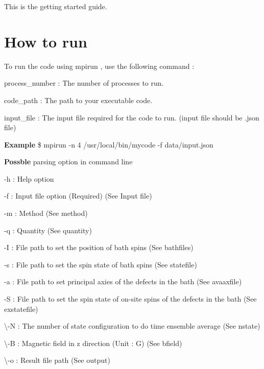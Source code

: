This is the getting started guide.\hypertarget{GettingStarted_HowToRun}{}\section{How to run}\label{GettingStarted_HowToRun}
To run the code using {\ttfamily  mpirun }, use the following command \-:





\begin{DoxyItemize}
\item process\-\_\-number \-: The number of processes to run.
\item code\-\_\-path \-: The path to your executable code.
\item input\-\_\-file \-: The input file required for the code to run. (input file should be {\ttfamily .json} file)
\end{DoxyItemize}

{\bfseries Example} {\bfseries }  \$ mpirun -\/n 4 /usr/local/bin/mycode -\/f data/input.\-json 

{\bfseries Possble} parsing option in command line {\bfseries } 


\begin{DoxyItemize}
\item -\/h \-: Help option
\item -\/f \-: Input file option (Required) (See Input file)
\item -\/m \-: Method (See method)
\item -\/q \-: Quantity (See quantity)
\item -\/\-I \-: File path to set the position of bath spins (See bathfiles)
\item -\/s \-: File path to set the spin state of bath spins (See statefile)
\item -\/a \-: File path to set principal axies of the defects in the bath (See avaaxfile)
\item -\/\-S \-: File path to set the spin state of on-\/site spins of the defects in the bath (See exstatefile)
\item \textbackslash{}-\/\-N \-: The number of state configuration to do time ensemble average (See nstate)
\item \textbackslash{}-\/\-B \-: Magnetic field in z direction (Unit \-: G) (See bfield)
\item \textbackslash{}-\/o \-: Result file path (See output) 
\end{DoxyItemize}